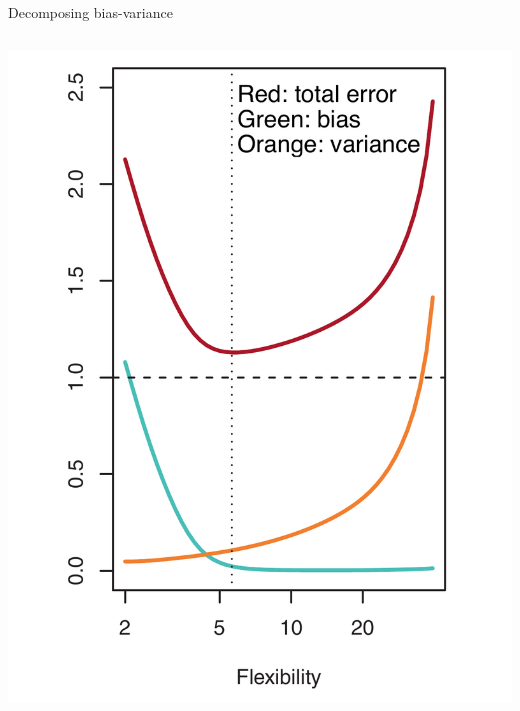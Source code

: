 \documentclass[aspectratio=169, handout]{beamer}
\begin{document}
\begin{frame}{Decomposing bias-variance}
\begin{columns}
\pause 
\includegraphics[scale=0.21]{figures/islr2_12a_text.pdf}

\end{columns}

\end{frame}
\end{document}
